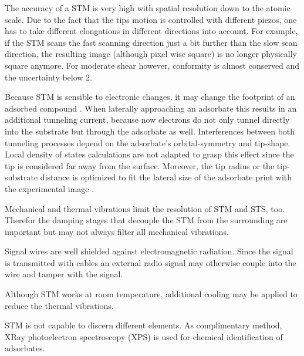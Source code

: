 The accuracy of a STM is very high with spatial resolution down to the atomic scale. Due to the fact that the tips motion is controlled with different piezos, one has to take different elongations in different directions into account. For example, if the STM scans the fast scanning direction just a bit further than the slow scan direction, the resulting image (although pixel wise square) is no longer physically square anymore. 
For moderate shear however, conformity is almost conserved and the uncertainty below 2\textdegree.

Because STM is sensible to electronic changes, it may change the footprint of an adsorbed compound \cite{sautet_interpretation_1992}. When laterally approaching an adsorbate this results in an additional tunneling current, because now electrons do not only tunnel directly into the substrate but through the adsorbate as well. Interferences between both tunneling processes depend on the adsorbate's orbital-symmetry and tip-shape. Local density of states calculations \cite{tersoff_theory_1985, lang_theory_1986, eigler_imaging_1991} are not adapted to grasp this effect since the tip is considered far away from the surface. Moreover, the tip radius or the tip-substrate distance is optimized to fit the lateral size of the adsorbate print with the experimental image \cite{tersoff_theory_1985, eigler_imaging_1991}.

Mechanical and thermal vibrations limit the resolution of STM and STS, too. Therefor the damping stages that decouple the STM from the surrounding are important but may not always filter all mechanical vibrations. 

Signal wires are well shielded against electromagnetic radiation. Since the signal is transmitted with cables an external radio signal may otherwise couple into the wire and tamper with the signal.

Although STM works at room temperature, additional cooling may be applied to reduce the thermal vibrations.

STM is not capable to discern different elements. As complimentary method, XRay photoelectron spectroscopy (XPS) is used for chemical identification of adsorbates.